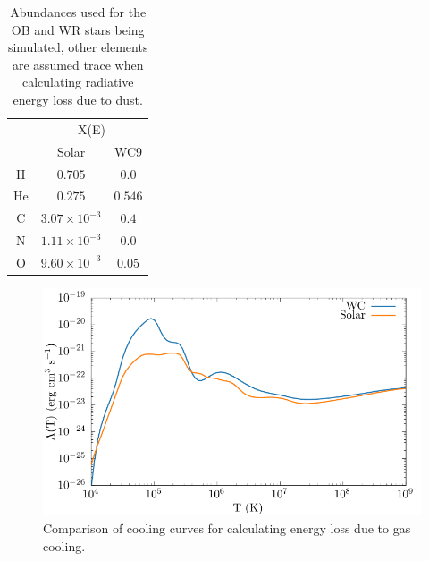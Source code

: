 \begin{table}
  \centering
  \begin{tabular}{@{}ccc@{}}
  \toprule
  \multicolumn{1}{l}{} & \multicolumn{2}{c}{X(E)} \\ \cmidrule(l){2-3} 
   & Solar & WC9 \\ \midrule
  H & $0.705$ & $0.0$ \\
  He & $0.275$ & $0.546$ \\
  C & $3.07 \times 10^{-3}$ & $0.4$ \\
  N & $1.11 \times 10^{-3}$ & $0.0$ \\
  O & $9.60 \times 10^{-3}$ & $0.05$ \\
  \end{tabular}
  \caption[Abundances used for OB and WR stars]{Abundances used for the OB and WR stars being simulated, other elements are assumed trace when calculating radiative energy loss due to dust.}
  \label{tab:abundances}
\end{table}


\begin{figure}[ht]
  \centering
  \includegraphics{assets/cooling-curve/cooling-curve-no-elements.pdf}
  \caption[WR and OB $\Lambda(T)$ cooling curves]{Comparison of cooling curves for calculating energy loss due to gas cooling.}
  \label{fig:cooling-curve}
\end{figure}

